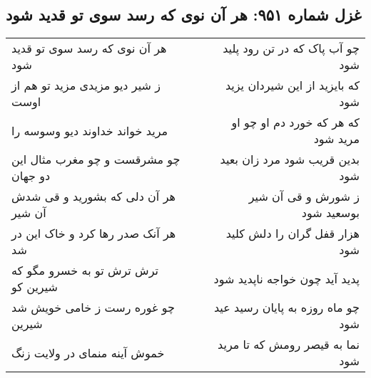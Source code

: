 \begin{center}
\section*{غزل شماره ۹۵۱: هر آن نوی که رسد سوی تو قدید شود}
\label{sec:0951}
\begin{longtable}{l p{0.5cm} r}
هر آن نوی که رسد سوی تو قدید شود
&&
چو آب پاک که در تن رود پلید شود
\\
ز شیر دیو مزیدی مزید تو هم از اوست
&&
که بایزید از این شیردان یزید شود
\\
مرید خواند خداوند دیو وسوسه را
&&
که هر که خورد دم او چو او مرید شود
\\
چو مشرقست و چو مغرب مثال این دو جهان
&&
بدین قریب شود مرد زان بعید شود
\\
هر آن دلی که بشورید و قی شدش آن شیر
&&
ز شورش و قی آن شیر بوسعید شود
\\
هر آنک صدر رها کرد و خاک این در شد
&&
هزار قفل گران را دلش کلید شود
\\
ترش ترش تو به خسرو مگو که شیرین کو
&&
پدید آید چون خواجه ناپدید شود
\\
چو غوره رست ز خامی خویش شد شیرین
&&
چو ماه روزه به پایان رسید عید شود
\\
خموش آینه منمای در ولایت زنگ
&&
نما به قیصر رومش که تا مرید شود
\\
\end{longtable}
\end{center}
